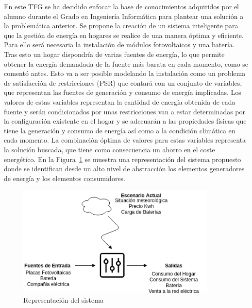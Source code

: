 En este \gls{TFG} se ha decidido enfocar la base de conocimientos adquiridos por el alumno durante el Grado en Ingeniería Informática para plantear una solución a la problemática anterior. Se propone la creación de un sistema inteligente para que la gestión de energía en hogares se realice de una manera óptima y eficiente. Para ello será necesaria la instalación de módulos fotovoltaicos y una batería. Tras esto un hogar dispondría de varias fuentes de energía, lo que permite obtener la energía demandada de la fuente más barata en cada momento, como se comentó antes. Esto va a ser posible modelando la instalación como un problema de satisfacción de restricciones (\gls{PSR}) que contará con un conjunto de variables, que representan las fuentes de generación y consumo de energía implicadas. Los valores de estas variables representan la cantidad de energía obtenida de cada fuente y serán condicionados por unas restricciones van a estar determinadas por la configuración existente en el hogar y se adecuarán a las propiedades físicas que tiene la generación y consumo de energía así como a la condición climática en cada momento. La combinación óptima de valores para estas variables representa la solución buscada, que tiene como consecuencia un ahorro en el coste energético. En la Figura~\ref{fig:abstract} se muestra una representación del sistema propuesto donde se identifican desde un alto nivel de abstracción los elementos generadores de energía y los elementos consumidores.\\
\begin{figure}[!h]
	\centering
	\includegraphics[width=10cm]{figs/Abstract.png}
	\caption{Representación del sistema}
        \label{fig:abstract}
\end{figure}



